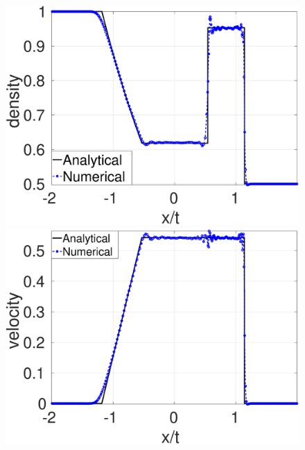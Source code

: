 \begin{figure}
    \centering
    \begin{minipage}{.495\textwidth}
        \centering
        \includegraphics[width=0.99 \textwidth]{Chapter-4/Figures/GSPH-Sod/GRod-RCM-rho}
    \end{minipage}%
    \begin{minipage}{.495 \textwidth}
        \centering
        \includegraphics[width=0.99 \textwidth]{Chapter-4/Figures/GSPH-Sod/GRod-RCM-v}
    \end{minipage}%
    \\
    \begin{minipage}{.495\textwidth}
        \centering

\end{minipage}
\end{figure}

